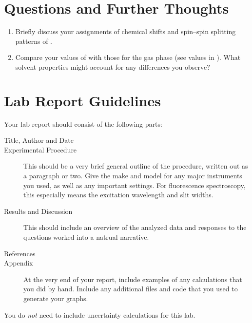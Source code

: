 
\section{Questions and Further Thoughts} %
\label{sec:questions_and_further_thoughts}

\begin{enumerate}
	\item Briefly discuss your assignments of chemical shifts and spin--spin splitting patterns of . 
	\item Compare your values of  with those for the gas phase (see values in \textcite{jarek97nmr}).
	What solvent properties might account for any differences you observe?
\end{enumerate}


\section{Lab Report Guidelines} %
\label{sec:lab_report_guidelines}

Your lab report should consist of the following parts:
\begin{description}
	\item[Title, Author and Date]
	\item[Experimental Procedure] This should be a very brief general outline of the procedure, written out as a paragraph or two. Give the make and model for any major instruments you used, as well as any important settings. For fluorescence spectroscopy, this especially means the excitation wavelength and slit widths.
	\item[Results and Discussion] This should include an overview of the analyzed data and responses to the questions worked into a natrual narrative.
	\item[References]
	\item[Appendix] At the very end of your report, include examples of any calculations that you did by hand. 
	Include any additional files and code that you used to generate your graphs.
\end{description}

\noindent You do \emph{not} need to include uncertainty calculations for this lab. 

